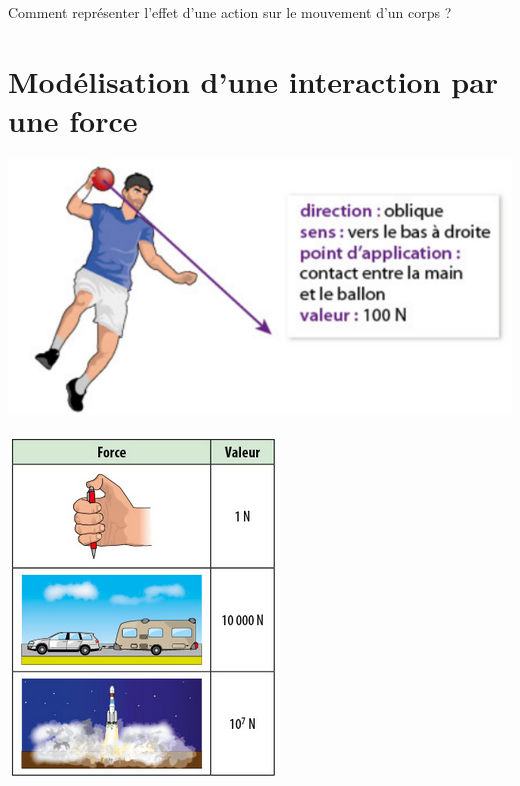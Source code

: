 \documentclass[12pt,a4paper]{article}
\date{}
\title{}
\begin{document}
	
	


\begin{mypb}
	\begin{center}
		{\Large Comment représenter l'effet d'une action sur le mouvement d'un corps ?}
	\end{center}
\end{mypb}

\section{Modélisation d'une interaction par une force}


%



\begin{multicols}{2}
	\begin{center}
		\includegraphics[scale=0.5]{ex_force}
	\end{center}

	\begin{center}
		\includegraphics[scale=0.5]{og_valeurs}
	\end{center}
\end{multicols}
\end{document}
